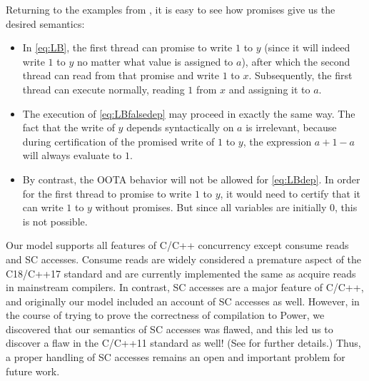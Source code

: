 Returning to the examples from , it is easy to see how
promises give us the desired semantics:
\begin{itemize}
\item In \ref{eq:LB}, the first thread can promise to write $1$ to $y$ (since
  it will indeed write $1$ to $y$ no matter what value is assigned to
  $a$), after which the second thread can read from that promise and
  write $1$ to $x$.  Subsequently, the first thread can execute
  normally, reading $1$ from $x$ and assigning it to $a$.
\item The execution of \ref{eq:LBfalsedep} may proceed in exactly the same way.  The
  fact that the write of $y$ depends syntactically on $a$ is
  irrelevant, because during certification of the promised write of $1$
  to $y$, the expression $a+1-a$ will always evaluate to $1$.
\item By contrast, the OOTA behavior will not be allowed for \ref{eq:LBdep}.
  In order for the first thread to promise to write $1$ to $y$, it
  would need to certify that it can write $1$ to $y$ 
without promises.  But since all variables are
  initially $0$, this is not possible.
\end{itemize}

Our model supports all features of C/C++ concurrency except consume
reads and SC accesses.  Consume reads are widely considered a
premature aspect of the C18/C++17 standard and are currently implemented
the same as acquire reads in mainstream compilers.  In contrast, SC
accesses are a major feature of C/C++, and originally our model included
an account of SC accesses as well.  However, in the course of trying
to prove the correctness of compilation to Power,
we discovered that our semantics of SC
accesses was flawed, and this led us to discover a flaw in the C/C++11
standard as well!  (See \cite{rc11} for further details.)
Thus, a proper handling of SC accesses remains an open and important
problem for future work.



